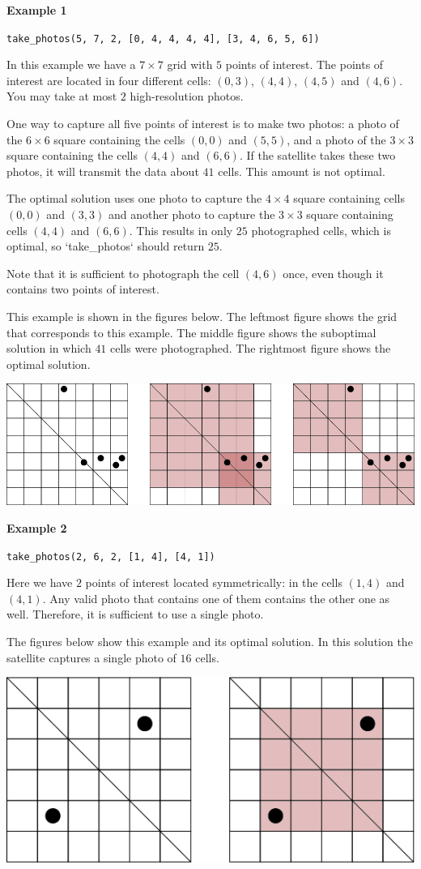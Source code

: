 \textbf{Example 1}

\texttt{take\_photos(5, 7, 2, [0, 4, 4, 4, 4], [3, 4, 6, 5, 6])}

In this example we have a $7 \times 7$ grid with $5$ points of interest. 
The points of interest are located in four different cells:
$(0, 3)$, $(4, 4)$, $(4, 5)$ and $(4, 6)$. You may take at most
$2$ high-resolution photos.

One way to capture all five points of interest is to make two photos: 
a photo of the $6 \times 6$ square containing the cells $(0, 0)$ 
and $(5, 5)$, and a photo of the $3 \times 3$ square containing the
cells $(4, 4)$ and $(6, 6)$. If the satellite takes these two photos, 
it will transmit the data about $41$ cells. This amount is not optimal.

The optimal solution uses one photo to capture the $4 \times 4$ square
 containing cells $(0, 0)$ and $(3, 3)$ and another photo to capture
 the $3 \times 3$ square containing cells $(4, 4)$ and $(6, 6)$.
 This results in only $25$ photographed cells, which is optimal, so 
 `take\_photos` should return $25$.

Note that it is sufficient to photograph the cell $(4, 6)$ once, even
though it contains two points of interest.

This example is shown in the figures below. The leftmost figure shows 
the grid that corresponds to this example. The middle figure shows the
suboptimal solution in which $41$ cells were photographed. The rightmost
figure shows the optimal solution.

\includegraphics[scale=1.5]{example1.png}

\textbf{Example 2}

\texttt{take\_photos(2, 6, 2, [1, 4], [4, 1])}

Here we have $2$ points of interest located symmetrically: in the cells
$(1, 4)$ and $(4, 1)$. Any valid photo that contains one of them contains
the other one as well. Therefore, it is sufficient to use a single photo. 

The figures below show this example and its optimal solution.
In this solution the satellite captures a single photo of $16$ cells.

\includegraphics[scale=1.5]{example2.png}

